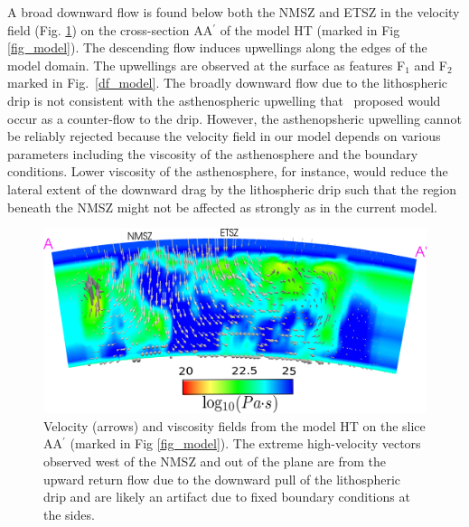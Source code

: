 \documentclass[draft,linenumbers]{agujournal2018}
\begin{document}
A broad downward flow is found below both the NMSZ and ETSZ in the velocity field (Fig. \ref{velocity_pattern}) on the cross-section AA$^{\prime}$ of the model HT (marked in Fig \ref{fig_model}). The descending flow induces upwellings along the edges of the model domain. The upwellings are observed at the surface as features F$_1$ and F$_2$ marked in Fig.~\ref{df_model}. The broadly downward flow due to the lithospheric drip is not consistent with the asthenospheric upwelling that~\citet{Biryol_2016} proposed would occur as a counter-flow to the drip. However, the asthenopsheric upwelling cannot be reliably rejected because the velocity field in our model depends on various parameters including the viscosity of the asthenosphere and the boundary conditions. %
Lower viscosity of the asthenosphere, for instance, would reduce the lateral extent of the downward drag by the lithospheric drip such that the region beneath the NMSZ might not be affected as strongly as in the current model. 
%    
\begin{figure}[ht]
    \centering
    \includegraphics[width=0.9\linewidth]{figures/velocity_pattern.png}
    \caption{Velocity (arrows) and viscosity fields from the model HT on the slice AA$^{\prime}$ (marked in Fig \ref{fig_model}). The extreme high-velocity vectors observed west of the NMSZ and out of the plane are from the upward return flow due to the downward pull of the lithospheric drip and are likely an artifact due to fixed boundary conditions at the sides.}
    \label{velocity_pattern}
\end{figure}     
\end{document}
